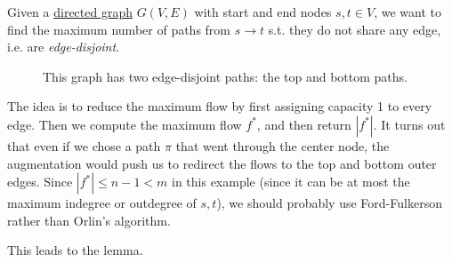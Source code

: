   \begin{example}
    \label{ex:edge-disjoint-paths}
    Given a \hyperref[def:directed-graph]{directed graph} $G(V, E)$ with start and end nodes $s, t \in V$, we want to find the maximum number of paths from $s \rightarrow t$ s.t. they do not share any edge, i.e. are \textit{edge-disjoint}. 
    \begin{figure}[H]
      \centering 
      \caption{This graph has two edge-disjoint paths: the top and bottom paths. } 
      \label{fig:edge_disjoint}
    \end{figure}
    
    The idea is to reduce the maximum flow by first assigning capacity 1 to every edge. Then we compute the maximum flow $f^\ast$, and then return $|f^\ast|$. It turns out that even if we chose a path $\pi$ that went through the center node, the augmentation would push us to redirect the flows to the top and bottom outer edges. Since $|f^\ast| \leq n-1 < m$ in this example (since it can be at most the maximum indegree or outdegree of $s, t$), we should probably use Ford-Fulkerson rather than Orlin's algorithm. 
  \end{example}

  This leads to the lemma. 

